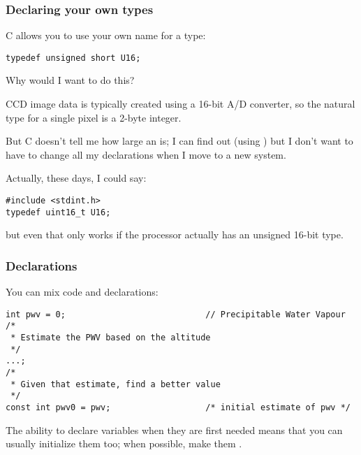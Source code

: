 \documentclass[10pt, t]{beamer}
\begin{document}
\begin{frame}[fragile]
\frametitle{Declaring your own types}
\label{sec-1-1-3}

C allows you to use your own name for a type:

\begin{verbatim}
typedef unsigned short U16;
\end{verbatim}



\pause
Why would I want to do this?

\pause
CCD image data is typically created using a 16-bit A/D converter, so
the natural type for a single pixel is a 2-byte integer.

But C doesn't tell me how large an  is; I
can find out (using ) but I don't want to have to change all my declarations when I move
to a new system.

\pause
Actually, these days, I could say:

\begin{verbatim}
#include <stdint.h>
typedef uint16_t U16;
\end{verbatim}



but even that only works if the processor actually has an unsigned 16-bit type.
\end{frame}
\begin{frame}[fragile]
\frametitle{Declarations}
\label{sec-1-1-4}

You can mix code and declarations:

\begin{verbatim}
int pwv = 0;                            // Precipitable Water Vapour
/*
 * Estimate the PWV based on the altitude
 */
...;
/*
 * Given that estimate, find a better value
 */
const int pwv0 = pwv;                   /* initial estimate of pwv */
\end{verbatim}



\pause
The ability to declare variables when they are first needed means that you can usually initialize them too;
when possible, make them .
\end{frame}
\end{document}
